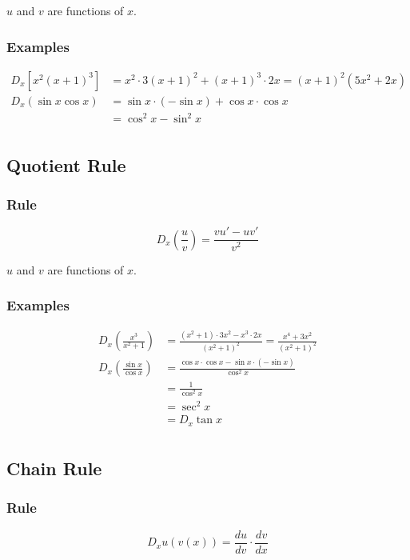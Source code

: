 \documentclass[fleqn]{article}
\begin{document}
$u$ and $v$ are functions of $x$.

\subsubsection{Examples}
\begin{align*}
  D_x \left[ x^2(x + 1)^3 \right] &= x^2 \cdot 3(x + 1)^2 + (x + 1)^3 \cdot 2x = (x + 1)^2(5x^2 + 2x) \\
  D_x (\sin x \cos x) &= \sin x \cdot (- \sin x) + \cos x \cdot \cos x \\
    &= \cos^2 x - \sin^2 x \\
\end{align*}

\subsection{Quotient Rule}
\subsubsection{Rule}

\[
  D_x \left( \frac{u}{v} \right) = \frac{vu' - uv'}{v^2}
\]

$u$ and $v$ are functions of $x$.

\subsubsection{Examples}
\begin{align*}
  D_x \left( \frac{x^3}{x^2 + 1} \right) &= \frac{(x^2 + 1) \cdot 3x^2 - x^3 \cdot 2x}{(x^2 + 1)^2} = \frac{x^4 + 3x^2}{(x^2 + 1)^2} \\
  D_x \left( \frac{\sin x}{\cos x} \right) &= \frac{\cos x \cdot \cos x - \sin x \cdot (- \sin x)}{\cos^2 x} \\
      &= \frac{1}{\cos^2 x} \\
      &= \sec^2 x \\
      &= D_x \tan x \\
\end{align*}

\subsection{Chain Rule}
\subsubsection{Rule}
\[
  D_x u(v(x)) = \frac{du}{dv} \cdot \frac{dv}{dx}
\]
\end{document}
